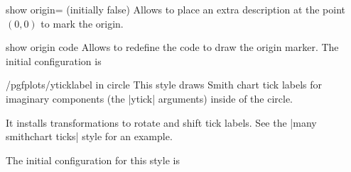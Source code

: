 \begin{pgfplotskey}{show origin= (initially false)}
    Allows to place an extra description at the point $(0,0)$ to mark the
    origin.
\begin{codeexample}[]
\end{codeexample}

    \begin{pgfplotscodekey}{show origin code}
        Allows to redefine the code to draw the origin marker. The initial
        configuration is
\begin{codeexample}
\end{codeexample}
    \end{pgfplotscodekey}
\end{pgfplotskey}

\begin{stylekey}{/pgfplots/yticklabel in circle}
    This style draws Smith chart tick labels for imaginary components (the
    |ytick| arguments) inside of the circle.

    It installs transformations to rotate and shift tick labels. See the
    |many smithchart ticks| style for an example.

    The initial configuration for this style is
\begin{codeexample}
\end{codeexample}
\end{stylekey}

